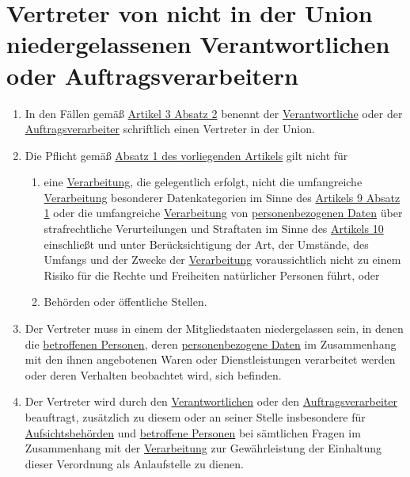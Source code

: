 \chapter{Vertreter von nicht in der Union niedergelassenen Verantwortlichen oder Auftragsverarbeitern}
\label{ch:27}


\begin{enumerate}

  \item In den Fällen gemäß \hyperref[itm:03-2]{Artikel 3 Absatz 2} benennt der \hyperref[itm:04-7]{Verantwortliche} oder der
   \hyperref[itm:04-8]{Auftragsverarbeiter} schriftlich einen Vertreter in der Union.
  \label{itm:27-1}

  \item Die Pflicht gemäß \hyperref[itm:27-1]{Absatz 1 des vorliegenden Artikels} gilt nicht für
  \label{itm:27-2}

  \begin{enumerate}
  
    \item eine \hyperref[itm:04-2]{Verarbeitung}, die gelegentlich erfolgt, nicht die umfangreiche \hyperref[itm:04-2]{Verarbeitung} besonderer Datenkategorien im
     Sinne des \hyperref[itm:09-1]{Artikels 9 Absatz 1} oder die umfangreiche \hyperref[itm:04-2]{Verarbeitung} von \hyperref[itm:04-1]{personenbezogenen Daten}
     über strafrechtliche Verurteilungen und Straftaten im Sinne des \hyperref[ch:10]{Artikels 10} einschließt und
     unter Berücksichtigung der Art, der Umstände, des Umfangs und der Zwecke der \hyperref[itm:04-2]{Verarbeitung} voraussichtlich nicht zu
     einem Risiko für die Rechte und Freiheiten natürlicher Personen führt, oder
    \label{itm:27-2a}

    \item Behörden oder öffentliche Stellen.
    \label{itm:27-2b}

  \end{enumerate}

  \item Der Vertreter muss in einem der Mitgliedstaaten niedergelassen sein, in denen die \hyperref[itm:04-1]{betroffenen Personen}, deren
   \hyperref[itm:04-1]{personenbezogene Daten} im Zusammenhang mit den ihnen angebotenen Waren oder Dienstleistungen verarbeitet werden oder
   deren Verhalten beobachtet wird, sich befinden.
  \label{itm:27-3}

  \item Der Vertreter wird durch den \hyperref[itm:04-7]{Verantwortlichen} oder den \hyperref[itm:04-8]{Auftragsverarbeiter} beauftragt, zusätzlich zu diesem oder
   an seiner Stelle insbesondere für \hyperref[itm:04-21]{Aufsichtsbehörden} und \hyperref[itm:04-1]{betroffene Personen} bei sämtlichen Fragen im Zusammenhang
   mit der \hyperref[itm:04-2]{Verarbeitung} zur Gewährleistung der Einhaltung dieser Verordnung als Anlaufstelle zu dienen.
  \label{itm:27-4}


\end{enumerate}

